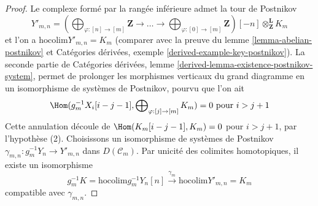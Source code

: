 \begin{proof}
Le complexe formé par la rangée inférieure admet la tour de Postnikov
$$
Y'_{m, n} =
\left(\bigoplus\nolimits_{\varphi : [n] \to [m]} \mathbf{Z} \to
\ldots \to
\bigoplus\nolimits_{\varphi : [0] \to [m]} \mathbf{Z}\right)[-n]
\otimes^\mathbf{L}_\mathbf{Z} K_m
$$
et l'on a $\text{hocolim} Y'_{m, n} = K_m$
(comparer avec la preuve du lemme \ref{lemma-abelian-postnikov}
et Catégories dérivées, exemple \ref{derived-example-key-postnikov}).
La seconde partie de
Catégories dérivées, lemme \ref{derived-lemma-existence-postnikov-system},
permet de prolonger les morphismes verticaux du grand diagramme en un isomorphisme
de systèmes de Postnikov, pourvu que l'on ait
$$
\Hom(g_m^{-1}X_i[i - j - 1], \bigoplus\nolimits_{\varphi : [j] \to [m]} K_m)
= 0\text{ pour }i > j + 1
$$
Cette annulation découle de $\Hom(K_m[i - j - 1], K_m) = 0$ pour $i > j + 1$,
par l'hypothèse (2). Choisissons un isomorphisme
de systèmes de Postnikov $\gamma_{m, n} : g_m^{-1}Y_n \to Y'_{m, n}$
dans $D(\mathcal{C}_m)$. Par unicité des colimites homotopiques,
il existe un isomorphisme
$$
g_m^{-1} K = \text{hocolim} g_m^{-1}Y_n[n]
\xrightarrow{\gamma_m}
\text{hocolim} Y'_{m, n} = K_m
$$
compatible avec $\gamma_{m, n}$.


\end{proof}
